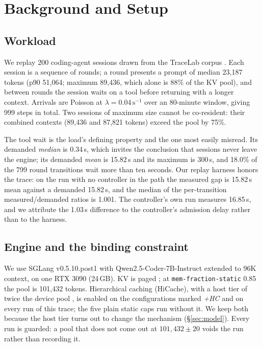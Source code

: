 \section{Background and Setup}
\label{sec:bg}

\subsection{Workload}

We replay 200 coding-agent sessions drawn from the TraceLab corpus
\cite{zhu2026tracelab}. Each session is a sequence of rounds; a round presents a
prompt of median 23{,}187 tokens (p90 51{,}064; maximum 89{,}436, which alone is
88\% of the KV pool), and between rounds the session waits on a tool before
returning with a longer context. Arrivals are Poisson at
$\lambda=0.04\,\text{s}^{-1}$ over an 80-minute window, giving 999 steps in
total. Two sessions of maximum size cannot be co-resident: their combined
contexts (89{,}436 and 87{,}821 tokens) exceed the pool by 75\%.

The tool wait is the load's defining property and the one most easily misread.
Its demanded \emph{median} is 0.34\,s, which invites the conclusion that sessions
never leave the engine; its demanded \emph{mean} is 15.82\,s and its maximum is
300\,s, and 18.0\% of the 799 round transitions wait more than ten seconds. Our
replay harness honors the trace: on the run with no controller in the path the
measured gap is 15.82\,s mean against a demanded 15.82\,s, and the median of the
per-transition measured/demanded ratios is 1.001. The controller's own run
measures 16.85\,s, and we attribute the 1.03\,s difference to the controller's
admission delay rather than to the harness.

\subsection{Engine and the binding constraint}

We use SGLang v0.5.10.post1 \cite{zheng2024sglang} with Qwen2.5-Coder-7B-Instruct
\cite{qwen2coder} extended to 96K context, on one RTX 3090 (24\,GB). KV is paged
\cite{kwon2023pagedattention}; at \texttt{mem-fraction-static} 0.85 the pool is
101{,}432 tokens. Hierarchical caching (HiCache), with a host tier of twice the
device pool \cite{flexgen,zerowsap}, is enabled on the configurations marked \emph{+HC} and on every
\sys{} run of this trace; the five plain static caps run without it. We keep both
because the host tier turns out to change the mechanism (\S\ref{sec:model}).
Every run is guarded: a pool that does not come out at $101{,}432 \pm 20$
voids the run rather than recording it.

